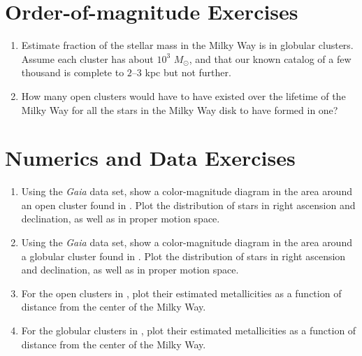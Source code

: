 \section{Order-of-magnitude Exercises}

\begin{enumerate} 
\item Estimate fraction of the stellar mass in the Milky Way is in
    globular clusters. Assume each cluster has about $10^3$ $M_\odot$,
    and that our known catalog of a few thousand is complete to
    $2$--$3$ kpc but not further.
\item How many open clusters would have to have existed over the
    lifetime of the Milky Way for all the stars in the Milky Way disk
to have formed in one?
\end{enumerate} 

\section{Numerics and Data Exercises}

\begin{enumerate}
\item Using the {\it Gaia} data set, show a color-magnitude
diagram in the area around an open cluster found
in \citet{dias02a}. Plot the distribution of stars in right ascension
and declination, as well as in proper motion space.
\item Using the {\it Gaia} data set, show a color-magnitude
diagram in the area around a globular cluster found
in \citet{harris96a}. Plot the distribution of stars in right
ascension and declination, as well as in proper motion space.
\item For the open clusters in \citet{dias02a}, plot their estimated
metallicities as a function of distance from the center of the Milky
Way.
\item For the globular clusters in \citet{harris96a}, plot their estimated
metallicities as a function of distance from the center of the Milky
Way.
\end{enumerate}


  

